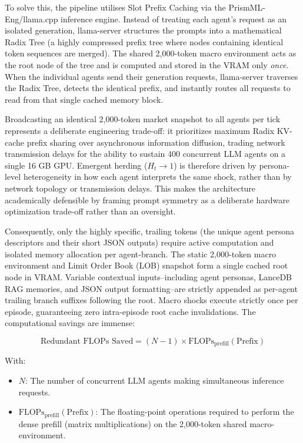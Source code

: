 \documentclass[10pt,a4paper]{article}
\begin{document}
To solve this, the pipeline utilises Slot Prefix Caching via the PrismML-Eng/llama.cpp inference engine. Instead of treating each agent's request as an isolated generation, llama-server structures the prompts into a mathematical Radix Tree (a highly compressed prefix tree where nodes containing identical token sequences are merged). The shared 2,000-token macro environment acts as the root node of the tree and is computed and stored in the VRAM only \textit{once}. When the individual agents send their generation requests, llama-server traverses the Radix Tree, detects the identical prefix, and instantly routes all requests to read from that single cached memory block.

Broadcasting an identical 2,000-token market snapshot to all agents per tick represents a deliberate engineering trade-off: it prioritizes maximum Radix KV-cache prefix sharing over asynchronous information diffusion, trading network transmission delays for the ability to sustain 400 concurrent LLM agents on a single 16 GB GPU. Emergent herding ($H_t \to 1$) is therefore driven by persona-level heterogeneity in how each agent interprets the same shock, rather than by network topology or transmission delays. This makes the architecture academically defensible by framing prompt symmetry as a deliberate hardware optimization trade-off rather than an oversight. 

Consequently, only the highly specific, trailing tokens (the unique agent persona descriptors and their short JSON outputs) require active computation and isolated memory allocation per agent-branch. The static 2,000-token macro environment and Limit Order Book (LOB) snapshot form a single cached root node in VRAM. Variable contextual inputs--including agent personas, LanceDB RAG memories, and JSON output formatting--are strictly appended as per-agent trailing branch suffixes following the root. Macro shocks execute strictly once per episode, guaranteeing zero intra-episode root cache invalidations. The computational savings are immense:

\[ \text{Redundant FLOPs Saved} = (N - 1) \times \text{FLOPs}_{\text{prefill}}(\text{Prefix}) \]

With:
\begin{itemize}
    \item $N$: The number of concurrent LLM agents making simultaneous inference requests.
    \item $\text{FLOPs}_{\text{prefill}}(\text{Prefix})$: The floating-point operations required to perform the dense prefill (matrix multiplications) on the 2,000-token shared macro-environment.
\end{itemize}
\end{document}
